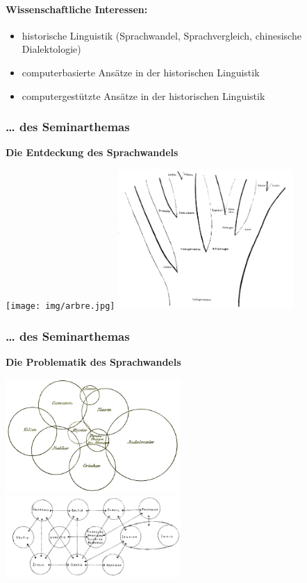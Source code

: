 \paragraph{Wissenschaftliche Interessen:}

\begin{itemize}
\itemsep1pt\parskip0pt
\item
  historische Linguistik (Sprachwandel, Sprachvergleich, chinesische
  Dialektologie)
\item
  computerbasierte Ansätze in der historischen Linguistik
\item
  computergestützte Ansätze in der historischen Linguistik
\end{itemize}

\pagebreak
\subsubsection{\texorpdfstring{{\ldots{} des
Seminarthemas}}{\ldots{} des Seminarthemas}}

\par\noindent\textbf{Die Entdeckung des Sprachwandels}

\texttt{[image: img/arbre.jpg]}
\includegraphics[width=0.5\textwidth]{img/schleicher.jpg}


\subsubsection{\texorpdfstring{{\ldots{} des
Seminarthemas}}{\ldots{} des Seminarthemas}}

\par\noindent\textbf{Die Problematik des Sprachwandels}

\includegraphics[width=0.5\textwidth]{img/hirt.jpg}
\includegraphics[width=0.5\textwidth]{img/bonfante.png}
\pagebreak


